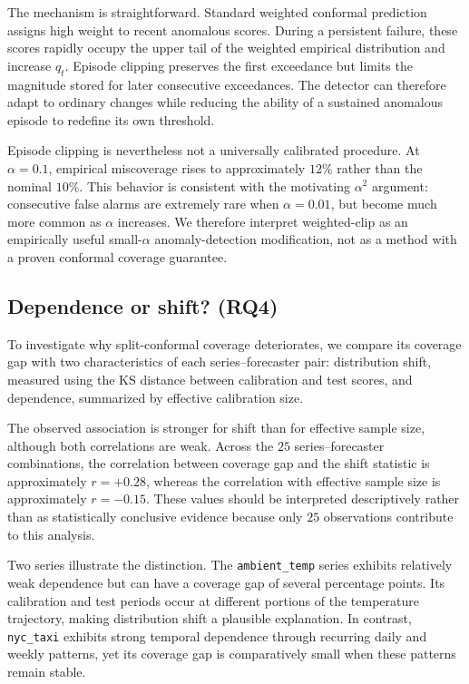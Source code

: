\documentclass[11pt]{article}
\theoremstyle{definition}
\theoremstyle{remark}
\begin{document}
The mechanism is straightforward. Standard weighted conformal prediction assigns high weight to recent anomalous scores. During a persistent failure, these scores rapidly occupy the upper tail of the weighted empirical distribution and increase $q_t$. Episode clipping preserves the first exceedance but limits the magnitude stored for later consecutive exceedances. The detector can therefore adapt to ordinary changes while reducing the ability of a sustained anomalous episode to redefine its own threshold.

Episode clipping is nevertheless not a universally calibrated procedure. At $\alpha = 0.1$, empirical miscoverage rises to approximately $12\%$ rather than the nominal $10\%$. This behavior is consistent with the motivating $\alpha^2$ argument: consecutive false alarms are extremely rare when $\alpha = 0.01$, but become much more common as $\alpha$ increases. We therefore interpret weighted-clip as an empirically useful small-$\alpha$ anomaly-detection modification, not as a method with a proven conformal coverage guarantee.

\subsection{Dependence or shift? (RQ4)}

To investigate why split-conformal coverage deteriorates, we compare its coverage gap with two characteristics of each series--forecaster pair: distribution shift, measured using the KS distance between calibration and test scores, and dependence, summarized by effective calibration size.

The observed association is stronger for shift than for effective sample size, although both correlations are weak. Across the $25$ series--forecaster combinations, the correlation between coverage gap and the shift statistic is approximately $r = +0.28$, whereas the correlation with effective sample size is approximately $r = -0.15$. These values should be interpreted descriptively rather than as statistically conclusive evidence because only $25$ observations contribute to this analysis.

Two series illustrate the distinction. The \texttt{ambient\_temp} series exhibits relatively weak dependence but can have a coverage gap of several percentage points. Its calibration and test periods occur at different portions of the temperature trajectory, making distribution shift a plausible explanation. In contrast, \texttt{nyc\_taxi} exhibits strong temporal dependence through recurring daily and weekly patterns, yet its coverage gap is comparatively small when these patterns remain stable.
\end{document}
